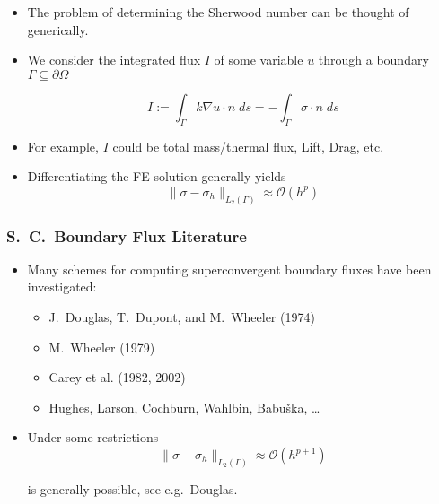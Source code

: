 \begin{frame}
      \begin{itemize}
      \item{
	The problem of determining the Sherwood number can be thought of generically.}

      \item{
	We consider the integrated flux $I$ of some variable $u$ through
	a boundary $\Gamma \subseteq \partial \Omega$

	\begin{equation}
	  \nonumber
	  I := \int_{\Gamma} k \nabla u \cdot n \;ds = -\int_{\Gamma} \sigma \cdot n \;ds 
	\end{equation}
      }
        
      \item{For example, $I$ could be total mass/thermal flux, Lift, Drag, etc.}

      \item{Differentiating the FE solution
	generally yields 
	\begin{equation}
	  \nonumber
	  \| \sigma - \sigma_h \|_{L_2(\Gamma)} \approx \mathcal{O}(h^p)
	\end{equation}
      } 
	
      \end{itemize}
\end{frame}


\begin{frame}
  \frametitle{S.~C.~Boundary Flux Literature}
      \begin{itemize}
      \item
	{
          Many schemes for computing superconvergent boundary fluxes have been investigated:

	  \begin{itemize}
	  \item{J.~Douglas, T.~Dupont, and M.~Wheeler (1974)}
	  \item{M.~Wheeler (1979)}
	  \item{Carey et al. (1982, 2002)}
	  \item{Hughes, Larson, Cochburn, Wahlbin, Babu{\v{s}}ka, \ldots}
	  \end{itemize}
	}
	
      \item{Under some restrictions
	\begin{equation}
	  \nonumber
	  \| \sigma - \sigma_h \|_{L_2(\Gamma)} \approx \mathcal{O}(h^{p+1})
	\end{equation}

	is generally possible, see e.g.\ Douglas.}
	
      \end{itemize}
\end{frame}



